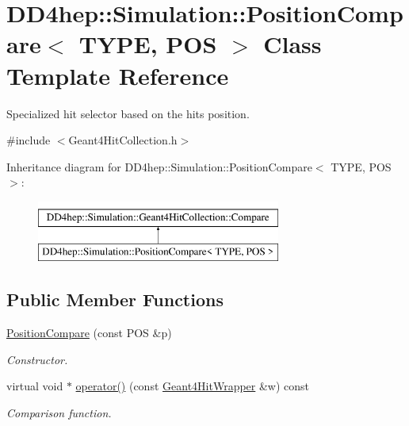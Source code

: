 \hypertarget{class_d_d4hep_1_1_simulation_1_1_position_compare}{}\section{D\+D4hep\+:\+:Simulation\+:\+:Position\+Compare$<$ T\+Y\+PE, P\+OS $>$ Class Template Reference}
\label{class_d_d4hep_1_1_simulation_1_1_position_compare}


Specialized hit selector based on the hit\textquotesingle{}s position.  




{\ttfamily \#include $<$Geant4\+Hit\+Collection.\+h$>$}

Inheritance diagram for D\+D4hep\+:\+:Simulation\+:\+:Position\+Compare$<$ T\+Y\+PE, P\+OS $>$\+:\begin{figure}[H]
\begin{center}
\leavevmode
\includegraphics[height=2.000000cm]{class_d_d4hep_1_1_simulation_1_1_position_compare}
\end{center}
\end{figure}
\subsection*{Public Member Functions}
\begin{DoxyCompactItemize}
\item 
\hyperlink{class_d_d4hep_1_1_simulation_1_1_position_compare_a68fc69a87bb8ea3da749e17642c7b366}{Position\+Compare} (const P\+OS \&p)
\begin{DoxyCompactList}\small\item\em Constructor. \end{DoxyCompactList}\item 
virtual void $\ast$ \hyperlink{class_d_d4hep_1_1_simulation_1_1_position_compare_ad530acff563b1b5ca6951ebd6aa08e9a}{operator()} (const \hyperlink{class_d_d4hep_1_1_simulation_1_1_geant4_hit_wrapper}{Geant4\+Hit\+Wrapper} \&w) const
\begin{DoxyCompactList}\small\item\em Comparison function. \end{DoxyCompactList}\end{DoxyCompactItemize}
